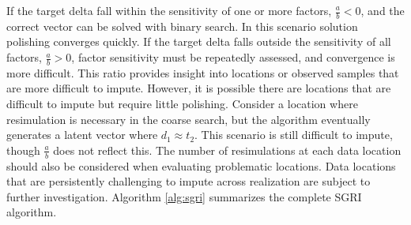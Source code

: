 If the target delta fall within the sensitivity of one or more factors, $\frac{a}{b}<0$, and the correct vector can be solved with binary search. In this scenario solution polishing converges quickly. If the target delta falls outside the sensitivity of all factors, $\frac{a}{b}>0$, factor sensitivity must be repeatedly assessed, and convergence is more difficult. This ratio provides insight into locations or observed samples that are more difficult to impute. However, it is possible there are locations that are difficult to impute but require little polishing. Consider a location where resimulation is necessary in the coarse search, but the algorithm eventually generates a latent vector where $d_{1} \approx t_{2}$. This scenario is still difficult to impute, though $\frac{a}{b}$ does not reflect this. The number of resimulations at each data location should also be considered when evaluating problematic locations. Data locations that are persistently challenging to impute across realization are subject to further investigation. Algorithm \ref{alg:sgri} summarizes the complete \gls{SGRI} algorithm.

